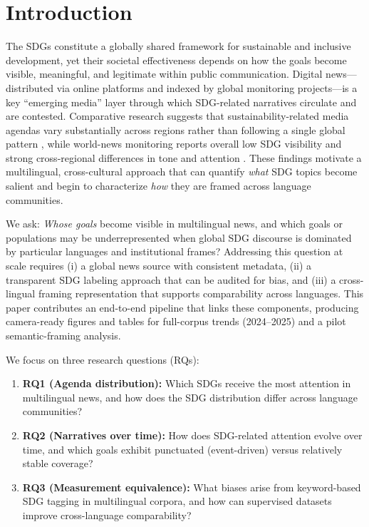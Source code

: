 \documentclass[11pt]{article}
\begin{document}
\section{Introduction}
The SDGs constitute a globally shared framework for sustainable and inclusive development, yet their societal effectiveness depends on how the goals become visible, meaningful, and legitimate within public communication. Digital news---distributed via online platforms and indexed by global monitoring projects---is a key ``emerging media'' layer through which SDG-related narratives circulate and are contested. Comparative research suggests that sustainability-related media agendas vary substantially across regions rather than following a single global pattern \parencite{barkemeyer2013sustainability}, while world-news monitoring reports overall low SDG visibility and strong cross-regional differences in tone and attention \parencite{czvetko2021intertwining}. These findings motivate a multilingual, cross-cultural approach that can quantify \emph{what} SDG topics become salient and begin to characterize \emph{how} they are framed across language communities.

We ask: \emph{Whose goals} become visible in multilingual news, and which goals or populations may be underrepresented when global SDG discourse is dominated by particular languages and institutional frames? Addressing this question at scale requires (i) a global news source with consistent metadata, (ii) a transparent SDG labeling approach that can be audited for bias, and (iii) a cross-lingual framing representation that supports comparability across languages. This paper contributes an end-to-end pipeline that links these components, producing camera-ready figures and tables for full-corpus trends (2024--2025) and a pilot semantic-framing analysis.

We focus on three research questions (RQs):
\begin{enumerate}
  \item \textbf{RQ1 (Agenda distribution):} Which SDGs receive the most attention in multilingual news, and how does the SDG distribution differ across language communities?
  \item \textbf{RQ2 (Narratives over time):} How does SDG-related attention evolve over time, and which goals exhibit punctuated (event-driven) versus relatively stable coverage?
  \item \textbf{RQ3 (Measurement equivalence):} What biases arise from keyword-based SDG tagging in multilingual corpora, and how can supervised datasets improve cross-language comparability?
\end{enumerate}
\end{document}
